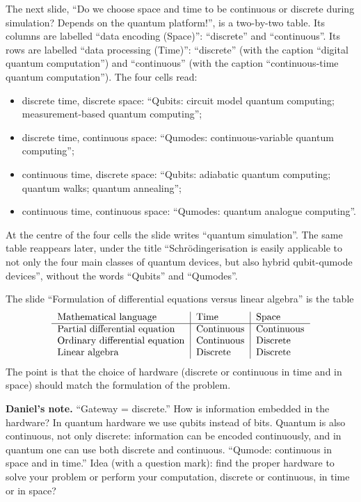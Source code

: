 \begin{remark}
\label{remark-liu-four-classes}
The next slide, ``Do we choose space and time
to be continuous or discrete during
simulation? Depends on the quantum
platform!'', is a two-by-two table. Its
columns are labelled ``data encoding
(Space)'': ``discrete'' and ``continuous''.
Its rows are labelled ``data processing
(Time)'': ``discrete'' (with the caption
``digital quantum computation'') and
``continuous'' (with the caption
``continuous-time quantum computation'').
The four cells read:
\begin{itemize}
\item discrete time, discrete space:
``Qubits: circuit model quantum computing;
measurement-based quantum computing'';

\item discrete time, continuous space:
``Qumodes: continuous-variable quantum
computing'';

\item continuous time, discrete space:
``Qubits: adiabatic quantum computing;
quantum walks; quantum annealing'';

\item continuous time, continuous space:
``Qumodes: quantum analogue computing''.
\end{itemize}
At the centre of the four cells the slide
writes ``quantum simulation''. The same table
reappears later, under the title
``Schr\"odingerisation is easily applicable to
not only the four main classes of quantum
devices, but also hybrid qubit-qumode
devices'', without the words ``Qubits'' and
``Qumodes''.
\end{remark}

\begin{remark}
\label{remark-liu-differential-vs-linear}
The slide ``Formulation of differential
equations versus linear algebra'' is the
table
$$
\begin{tabular}{l|l|l}
Mathematical language & Time & Space \\
\hline
Partial differential equation & Continuous
& Continuous \\
Ordinary differential equation & Continuous
& Discrete \\
Linear algebra & Discrete & Discrete
\end{tabular}
$$
The point is that the choice of hardware
(discrete or continuous in time and in space)
should match the formulation of the problem.
\end{remark}

\medskip\noindent
{\bf Daniel's note.}
``Gateway = discrete.'' How is information
embedded in the hardware? In quantum hardware
we use qubits instead of bits. Quantum is
also continuous, not only discrete:
information can be encoded continuously, and
in quantum one can use both discrete and
continuous. ``Qumode: continuous in space and
in time.'' Idea (with a question mark): find
the proper hardware to solve your problem or
perform your computation, discrete or
continuous, in time or in space?


